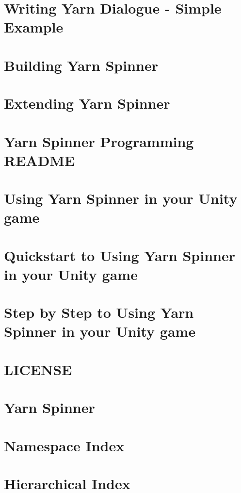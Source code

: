 \documentclass[twoside]{book}
\begin{document}
\chapter{Writing Yarn Dialogue -\/ Simple Example}
\label{a00016}
\hypertarget{a00016}{}

\chapter{Building Yarn Spinner}
\label{a00018}
\hypertarget{a00018}{}

\chapter{Extending Yarn Spinner}
\label{a00020}
\hypertarget{a00020}{}

\chapter{Yarn Spinner Programming R\-E\-A\-D\-M\-E}
\label{a00022}
\hypertarget{a00022}{}

\chapter{Using Yarn Spinner in your Unity game}
\label{a00024}
\hypertarget{a00024}{}

\chapter{Quickstart to Using Yarn Spinner in your Unity game}
\label{a00026}
\hypertarget{a00026}{}

\chapter{Step by Step to Using Yarn Spinner in your Unity game}
\label{a00028}
\hypertarget{a00028}{}

\chapter{L\-I\-C\-E\-N\-S\-E}
\label{a00030}
\hypertarget{a00030}{}

\chapter{Yarn Spinner}
\label{a00032}
\hypertarget{a00032}{}

\chapter{Namespace Index}

\chapter{Hierarchical Index}

\end{document}
